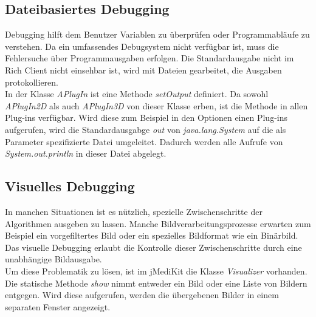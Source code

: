 \subsection{Dateibasiertes Debugging}
Debugging hilft dem Benutzer Variablen zu überprüfen oder Programmabläufe zu verstehen. Da ein umfassendes Debugsystem nicht verfügbar ist, muss die Fehlersuche über Programmausgaben erfolgen. Die Standardausgabe nicht im Rich Client nicht einsehbar ist, wird mit Dateien gearbeitet, die Ausgaben protokollieren.\\
In der Klasse \textit{APlugIn} ist eine Methode \textit{setOutput} definiert. Da sowohl \textit{APlugIn2D} als auch \textit{APlugIn3D} von dieser Klasse erben, ist die Methode in allen Plug-ins verfügbar. Wird diese zum Beispiel in den Optionen einen Plug-ins aufgerufen, wird die Standardausgabge \textit{out} von \textit{java.lang.System} auf die als Parameter spezifizierte Datei umgeleitet. Dadurch werden alle Aufrufe von \textit{System.out.println} in dieser Datei abgelegt.

\subsection{Visuelles Debugging}
In manchen Situationen ist es nützlich, spezielle Zwischenschritte der Algorithmen ausgeben zu lassen. Manche Bildverarbeitungsprozesse erwarten zum Beispiel ein vorgefiltertes Bild oder ein spezielles Bildformat wie ein Binärbild. Das visuelle Debugging erlaubt die Kontrolle dieser Zwischenschritte durch eine unabhängige Bildausgabe.\\
Um diese Problematik zu lösen, ist im jMediKit die Klasse \textit{Visualizer} vorhanden. Die statische Methode \textit{show} nimmt entweder ein Bild oder eine Liste von Bildern entgegen. Wird diese aufgerufen, werden die übergebenen Bilder in einem separaten Fenster angezeigt.

